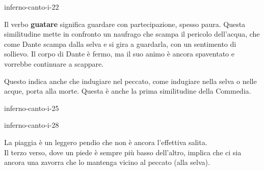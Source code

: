 \documentclass[preview]{standalone}
\begin{document}
\begin{snippet}{inferno-canto-i-22}

    Il verbo \textbf{guatare} significa guardare con partecipazione, spesso paura.
    Questa similitudine mette in confronto un naufrago che scampa il pericolo dell'acqua,
    che come Dante scampa dalla selva e si gira a guardarla, con un sentimento di sollievo.
    Il corpo di Dante è fermo, ma il suo animo è ancora spaventato e vorrebbe continuare a scappare.
    
    Questo indica anche che indugiare nel peccato, come indugiare nella selva o nelle acque, porta alla morte.
    Questa è anche la prima similitudine della Commedia.
\end{snippet}

\begin{snippet}{inferno-canto-i-25}
\end{snippet}

\begin{snippet}{inferno-canto-i-28}

    La piaggia è un leggero pendio che non è ancora l'effettiva salita.
    \\
    Il terzo verso, dove un piede è sempre più basso dell'altro,
    implica che ci sia ancora una zavorra che lo mantenga vicino al peccato (alla selva).
\end{snippet}
\end{document}
